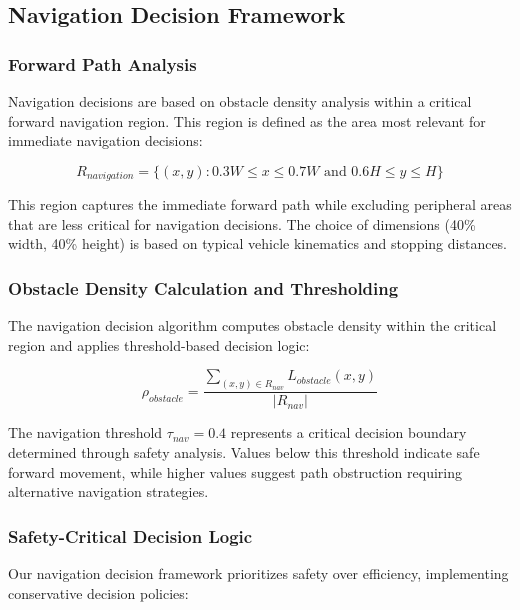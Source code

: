 \documentclass[12pt,oneside]{book}
\begin{document}
\subsection{Navigation Decision Framework}

\subsubsection{Forward Path Analysis}

Navigation decisions are based on obstacle density analysis within a critical forward navigation region. This region is defined as the area most relevant for immediate navigation decisions:

\begin{equation}
R_{navigation} = \{(x,y) : 0.3W \leq x \leq 0.7W \text{ and } 0.6H \leq y \leq H\}
\label{eq:navigation_region_detailed}
\end{equation}

This region captures the immediate forward path while excluding peripheral areas that are less critical for navigation decisions. The choice of dimensions (40\% width, 40\% height) is based on typical vehicle kinematics and stopping distances.

\subsubsection{Obstacle Density Calculation and Thresholding}

The navigation decision algorithm computes obstacle density within the critical region and applies threshold-based decision logic:

\begin{equation}
\rho_{obstacle} = \frac{\sum_{(x,y) \in R_{nav}} L_{obstacle}(x,y)}{|R_{nav}|}
\label{eq:obstacle_density_detailed}
\end{equation}

The navigation threshold $\tau_{nav} = 0.4$ represents a critical decision boundary determined through safety analysis. Values below this threshold indicate safe forward movement, while higher values suggest path obstruction requiring alternative navigation strategies.

\subsubsection{Safety-Critical Decision Logic}

Our navigation decision framework prioritizes safety over efficiency, implementing conservative decision policies:
\end{document}
